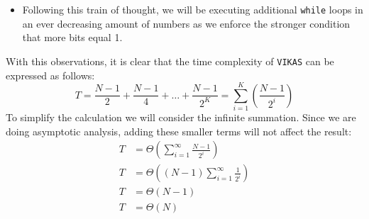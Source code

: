 \documentclass{article}
\begin{document}
\begin{enumerate}[1.]
\begin{enumerate}[(a)]
\begin{itemize}
                \item Following this train of thought, we will be executing additional \texttt{while} loops in an ever decreasing amount of numbers as we enforce the stronger condition that more bits equal 1.
            \end{itemize}
        With this observations, it is clear that the time complexity of \texttt{VIKAS} can be expressed as follows:
        \begin{equation*}
            T = \frac{N-1}{2} + \frac{N-1}{4} + \ldots + \frac{N-1}{2^K} = \sum_{i = 1}^K\left(\frac{N-1}{2^i}\right)
        \end{equation*}
        To simplify the calculation we will consider the infinite summation. Since we are doing asymptotic analysis, adding these smaller terms will not affect the result: 
        \begin{align*}
            T &= \Theta\left(\sum_{i = 1}^{\infty} \frac{N-1}{2^i}\right)\\
            T &= \Theta\left((N-1)\sum_{i = 1}^{\infty} \frac{1}{2^i}\right)\\
            T &= \Theta(N-1)\\
            T &= \Theta(N)\\
        \end{align*}
    \end{enumerate}

\end{enumerate}
\end{document}
